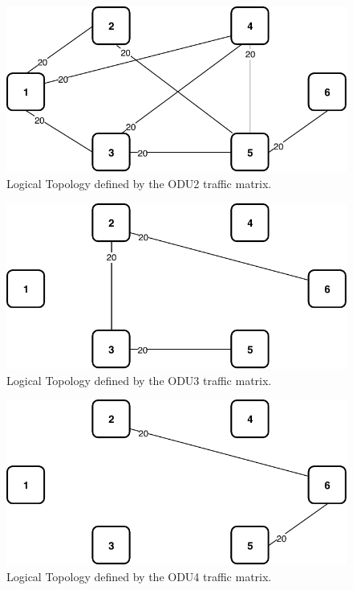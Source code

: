 \begin{figure}[h!]
\centering
\includegraphics[width=12cm]{sdf/ilp/opaque_protection/figures/logical_topology_ODU2_high}
\caption{Logical Topology defined by the ODU2 traffic matrix.}
\label{logical_ODU2_protectionhigh}
\end{figure}

\begin{figure}[h!]
\centering
\includegraphics[width=12cm]{sdf/ilp/opaque_protection/figures/logical_topology_ODU3_high}
\caption{Logical Topology defined by the ODU3 traffic matrix.}
\label{logical_ODU3_protectionhigh}
\end{figure}

\begin{figure}[h!]
\centering
\includegraphics[width=12cm]{sdf/ilp/opaque_protection/figures/logical_topology_ODU4_high}
\caption{Logical Topology defined by the ODU4 traffic matrix.}
\label{logical_ODU4_protectionhigh}
\end{figure}

